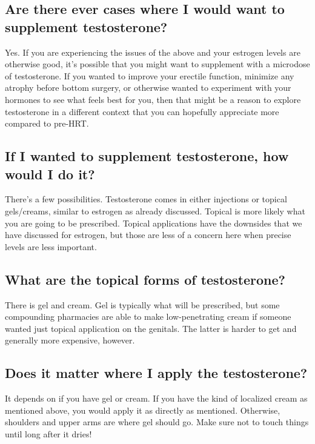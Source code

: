 \documentclass{article}
\begin{document}
{{\subsection{Are there ever cases where I would want to supplement testosterone?}\label{9-2}

Yes. If you are experiencing the issues of the above and your estrogen levels are otherwise good, it’s possible that you might want to supplement with a microdose of testosterone. If you wanted to improve your erectile function, minimize any atrophy before bottom surgery, or otherwise wanted to experiment with your hormones to see what feels best for you, then that might be a reason to explore testosterone in a different context that you can hopefully appreciate more compared to pre-HRT.

\subsection{If I wanted to supplement testosterone, how would I do it?}

There’s a few possibilities. Testosterone comes in either injections or topical gels/creams, similar to estrogen as already discussed. Topical is more likely what you are going to be prescribed. Topical applications have the downsides that we have discussed for estrogen, but those are less of a concern here when precise levels are less important.

\subsection{What are the topical forms of testosterone?}

There is gel and cream. Gel is typically what will be prescribed, but some compounding pharmacies are able to make low-penetrating cream if someone wanted just topical application on the genitals. The latter is harder to get and generally more expensive, however.

\subsection{Does it matter where I apply the testosterone?}

It depends on if you have gel or cream. If you have the kind of localized cream as mentioned above, you would apply it as directly as mentioned. Otherwise, shoulders and upper arms are where gel should go. Make sure not to touch things until long after it dries!

}}
\end{document}
